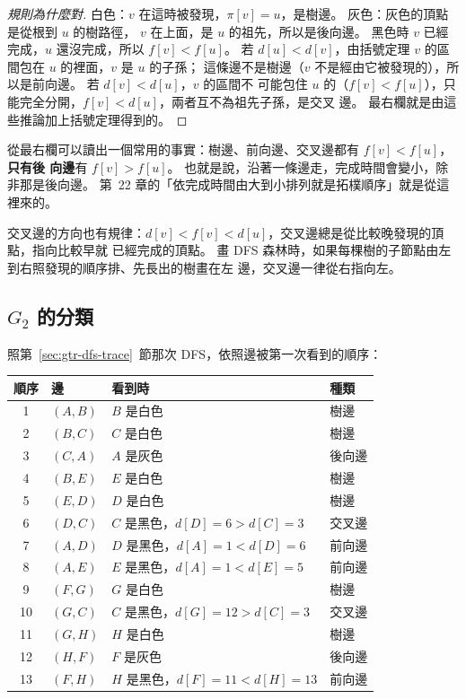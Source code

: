 \begin{proof}[規則為什麼對]
白色：$v$ 在這時被發現，$\pi[v] = u$，是樹邊。 灰色：灰色的頂點是從根到 $u$ 的樹路徑，
$v$ 在上面，是 $u$ 的祖先，所以是後向邊。 黑色時 $v$ 已經完成，$u$ 還沒完成，所以
$f[v] < f[u]$。 若 $d[u] < d[v]$，由括號定理 $v$ 的區間包在 $u$ 的裡面，$v$ 是 $u$ 的子孫；
這條邊不是樹邊（$v$ 不是經由它被發現的），所以是前向邊。 若 $d[v] < d[u]$，$v$ 的區間不
可能包住 $u$ 的（$f[v] < f[u]$），只能完全分開，$f[v] < d[u]$，兩者互不為祖先子孫，是交叉
邊。 最右欄就是由這些推論加上括號定理得到的。
\end{proof}

從最右欄可以讀出一個常用的事實：樹邊、前向邊、交叉邊都有 $f[v] < f[u]$，\textbf{只有後
向邊}有 $f[v] > f[u]$。 也就是說，沿著一條邊走，完成時間會變小，除非那是後向邊。 第~22
章的「依完成時間由大到小排列就是拓樸順序」就是從這裡來的。

交叉邊的方向也有規律：$d[v] < f[v] < d[u]$，交叉邊總是從比較晚發現的頂點，指向比較早就
已經完成的頂點。 畫 DFS 森林時，如果每棵樹的子節點由左到右照發現的順序排、先長出的樹畫在左
邊，交叉邊一律從右指向左。

\subsection{$G_2$ 的分類}

照第~\ref{sec:gtr-dfs-trace}~節那次 DFS，依照邊被第一次看到的順序：

\begin{center}
\begin{tabular}{clll}
\toprule
順序 & 邊 & 看到時 & 種類 \\
\midrule
1 & $(A, B)$ & $B$ 是白色 & 樹邊 \\
2 & $(B, C)$ & $C$ 是白色 & 樹邊 \\
3 & $(C, A)$ & $A$ 是灰色 & 後向邊 \\
4 & $(B, E)$ & $E$ 是白色 & 樹邊 \\
5 & $(E, D)$ & $D$ 是白色 & 樹邊 \\
6 & $(D, C)$ & $C$ 是黑色，$d[D] = 6 > d[C] = 3$ & 交叉邊 \\
7 & $(A, D)$ & $D$ 是黑色，$d[A] = 1 < d[D] = 6$ & 前向邊 \\
8 & $(A, E)$ & $E$ 是黑色，$d[A] = 1 < d[E] = 5$ & 前向邊 \\
9 & $(F, G)$ & $G$ 是白色 & 樹邊 \\
10 & $(G, C)$ & $C$ 是黑色，$d[G] = 12 > d[C] = 3$ & 交叉邊 \\
11 & $(G, H)$ & $H$ 是白色 & 樹邊 \\
12 & $(H, F)$ & $F$ 是灰色 & 後向邊 \\
13 & $(F, H)$ & $H$ 是黑色，$d[F] = 11 < d[H] = 13$ & 前向邊 \\
\bottomrule
\end{tabular}
\end{center}

